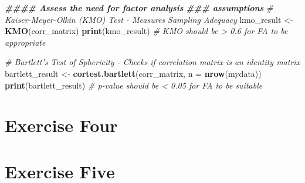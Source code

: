 \documentclass[
]{book}
\newenvironment{Shaded}{\begin{snugshade}}{\end{snugshade}}
\newcommand{\AttributeTok}[1]{\textcolor[rgb]{0.13,0.29,0.53}{#1}}
\newcommand{\CommentTok}[1]{\textcolor[rgb]{0.56,0.35,0.01}{\textit{#1}}}
\newcommand{\ConstantTok}[1]{\textcolor[rgb]{0.56,0.35,0.01}{#1}}
\newcommand{\DecValTok}[1]{\textcolor[rgb]{0.00,0.00,0.81}{#1}}
\newcommand{\DocumentationTok}[1]{\textcolor[rgb]{0.56,0.35,0.01}{\textbf{\textit{#1}}}}
\newcommand{\FunctionTok}[1]{\textcolor[rgb]{0.13,0.29,0.53}{\textbf{#1}}}
\newcommand{\NormalTok}[1]{#1}
\newcommand{\OtherTok}[1]{\textcolor[rgb]{0.56,0.35,0.01}{#1}}
\newcommand{\SpecialCharTok}[1]{\textcolor[rgb]{0.81,0.36,0.00}{\textbf{#1}}}
\newcommand{\StringTok}[1]{\textcolor[rgb]{0.31,0.60,0.02}{#1}}
\let\oldsection\section
\renewcommand{\section}{\needspace{5\baselineskip}\oldsection}
\begin{document}
\begin{Shaded}
\begin{Highlighting}[]
\DocumentationTok{\#\#\#\# Assess the need for factor analysis}
\DocumentationTok{\#\#\# assumptions}
\CommentTok{\# Kaiser{-}Meyer{-}Olkin (KMO) Test {-} Measures Sampling Adequacy}
\NormalTok{kmo\_result }\OtherTok{\textless{}{-}} \FunctionTok{KMO}\NormalTok{(corr\_matrix)}
\FunctionTok{print}\NormalTok{(kmo\_result)  }\CommentTok{\# KMO should be \textgreater{} 0.6 for FA to be appropriate}

\CommentTok{\# Bartlett’s Test of Sphericity {-} Checks if correlation matrix is an identity matrix}
\NormalTok{bartlett\_result }\OtherTok{\textless{}{-}} \FunctionTok{cortest.bartlett}\NormalTok{(corr\_matrix, }\AttributeTok{n =} \FunctionTok{nrow}\NormalTok{(mydata))}
\FunctionTok{print}\NormalTok{(bartlett\_result)  }\CommentTok{\# p{-}value should be \textless{} 0.05 for FA to be suitable}
\end{Highlighting}
\end{Shaded}

\section{Exercise Four}\label{exercise-four}

\begin{Shaded}
\end{Shaded}

\section{Exercise Five}\label{exercise-five}
\end{document}
